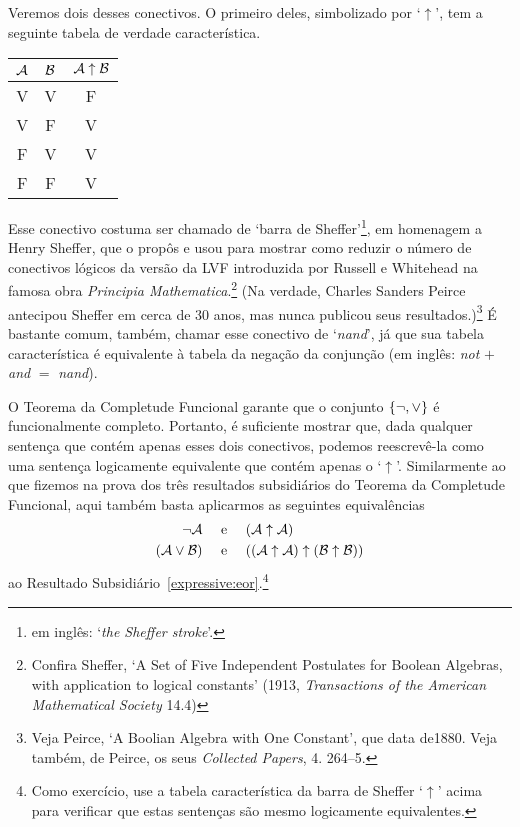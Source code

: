 Veremos dois desses conectivos.
O primeiro deles, simbolizado por `$\uparrow$', tem a seguinte tabela de verdade característica. 
\begin{center}
\begin{tabular}{c c | c}
$\mathcal{A}$ & $\mathcal{B}$ & $\mathcal{A} \mathrel{\uparrow} \mathcal{B}$\\
\hline
 V & V & F \\
 V & F & V \\
 F & V & V  \\
 F & F & V
\end{tabular}
\end{center}

Esse conectivo costuma ser chamado de `barra de Sheffer'\footnote{ em inglês: `\emph{the Sheffer stroke}'.}, em homenagem a Henry Sheffer, que o propôs e usou para mostrar como reduzir o número de conectivos lógicos da versão da LVF introduzida por Russell e Whitehead na famosa obra  \emph{Principia Mathematica}.\footnote{
 Confira Sheffer, `A Set of Five Independent Postulates for Boolean Algebras, with application to logical constants' (1913, \emph{Transactions of the American Mathematical Society} 14.4)}
 (Na verdade, Charles Sanders Peirce antecipou Sheffer em cerca de 30 anos, mas nunca publicou seus resultados.)\footnote{
 Veja Peirce, `A Boolian Algebra with One Constant', que data de1880. Veja também, de Peirce, os seus  \emph{Collected Papers}, 4. 264--5.}
 É bastante comum, também, chamar esse conectivo de `\emph{nand}', já que sua tabela característica é equivalente à tabela da negação da conjunção (em inglês: \emph{not} $+$ \emph{and} $=$ \emph{nand}).

O Teorema da Completude Funcional garante que o conjunto $\{\neg, \vee\}$ é funcionalmente completo.
Portanto, é suficiente mostrar que, dada qualquer sentença que contém apenas esses dois conectivos, podemos reescrevê-la como uma sentença logicamente equivalente que contém apenas o `$\uparrow$'.
Similarmente ao que fizemos na prova dos três resultados subsidiários do Teorema da Completude Funcional, aqui também basta aplicarmos as seguintes equivalências
		\begin{align*}
			\neg \mathcal{A} &\text{\quad \ e \quad} (\mathcal{A} \uparrow \mathcal{A})\\
			(\mathcal{A} \vee \mathcal{B}) & \text{\quad \ e \quad} ((\mathcal{A} \uparrow \mathcal{A}) \uparrow (\mathcal{B} \uparrow \mathcal{B}))
		\end{align*}
ao Resultado Subsidiário~\ref{expressive:eor}.\footnote{
	Como exercício, use a tabela característica da barra de Sheffer `$\uparrow$' acima para verificar que estas sentenças são mesmo logicamente equivalentes.}

